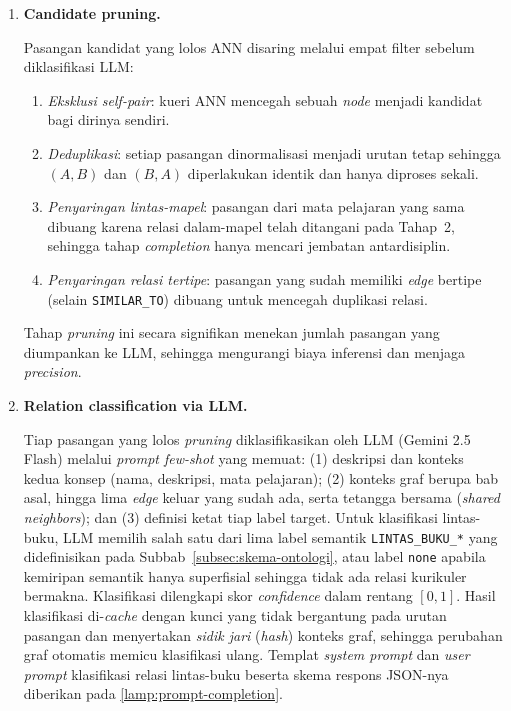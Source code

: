 \documentclass[../../thesis]{subfiles}
\begin{document}
\begin{enumerate}
  Hanya pasangan dengan $\text{sim} \geq \tau$ (dengan $\tau = 0{,}70$ untuk
  pencarian lintas-buku) yang lolos ke tahap berikutnya:
  \[
    \text{candidates}(q)
    = \bigl\{\, c \in \mathcal{C} \;\big|\; \text{sim}(\mathbf{e}_q,\, \mathbf{e}_c) \geq \tau \,\bigr\}
  \]
  Berkat indeks HNSW (Subbab~\ref{subsec:kgc}), pencarian kandidat menghindari
  perbandingan \textit{pairwise} $O(n^2)$ sehingga tetap \textit{tractable} pada
  skala ratusan hingga ribuan konsep.

  \item \textbf{Candidate pruning.}

  Pasangan kandidat yang lolos ANN disaring melalui empat filter sebelum
  diklasifikasi LLM:
  \begin{enumerate}[label=\roman*.]
    \item \textit{Eksklusi self-pair}: kueri ANN mencegah sebuah \textit{node}
      menjadi kandidat bagi dirinya sendiri.
    \item \textit{Deduplikasi}: setiap pasangan dinormalisasi menjadi urutan
      tetap sehingga $(A,B)$ dan $(B,A)$ diperlakukan identik dan hanya diproses
      sekali.
    \item \textit{Penyaringan lintas-mapel}: pasangan dari mata pelajaran yang
      sama dibuang karena relasi dalam-mapel telah ditangani pada Tahap~2,
      sehingga tahap \textit{completion} hanya mencari jembatan antardisiplin.
    \item \textit{Penyaringan relasi tertipe}: pasangan yang sudah memiliki
      \textit{edge} bertipe (selain \texttt{SIMILAR\_TO}) dibuang untuk mencegah
      duplikasi relasi.
  \end{enumerate}
  Tahap \textit{pruning} ini secara signifikan menekan jumlah pasangan yang
  diumpankan ke LLM, sehingga mengurangi biaya inferensi dan menjaga
  \textit{precision}.

  \item \textbf{Relation classification via LLM.}

  Tiap pasangan yang lolos \textit{pruning} diklasifikasikan oleh LLM
  (Gemini 2.5 Flash) melalui \textit{prompt few-shot} yang memuat: (1)
  deskripsi dan konteks kedua konsep (nama, deskripsi, mata pelajaran); (2)
  konteks graf berupa bab asal, hingga lima \textit{edge} keluar yang sudah ada,
  serta tetangga bersama (\textit{shared neighbors}); dan (3) definisi ketat tiap
  label target. Untuk klasifikasi lintas-buku, LLM memilih salah satu dari lima
  label semantik \texttt{LINTAS\_BUKU\_*} yang didefinisikan pada
  Subbab~\ref{subsec:skema-ontologi}, atau label \texttt{none} apabila kemiripan
  semantik hanya superfisial sehingga tidak ada relasi kurikuler bermakna.
  Klasifikasi dilengkapi skor \textit{confidence} dalam rentang $[0, 1]$. Hasil
  klasifikasi di-\textit{cache} dengan kunci yang tidak bergantung pada urutan
  pasangan dan menyertakan \textit{sidik jari} (\textit{hash}) konteks graf,
  sehingga perubahan graf otomatis memicu klasifikasi ulang. Templat
  \textit{system prompt} dan \textit{user prompt} klasifikasi relasi lintas-buku
  beserta skema respons JSON-nya diberikan pada
  \ref{lamp:prompt-completion}.



\end{enumerate}
\end{document}
